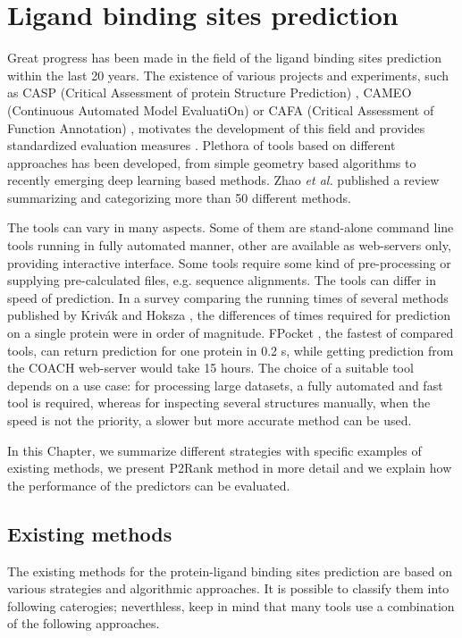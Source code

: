 \chapter{Ligand binding sites prediction} \label{ch:2}

Great progress has been made in the field of the ligand binding sites prediction within the last 20 years. The existence of various projects and experiments, such as CASP (Critical Assessment of protein Structure Prediction) \cite{casp_def}, CAMEO (Continuous Automated Model EvaluatiOn) \cite{cameo} or CAFA (Critical Assessment of Function Annotation) \cite{cafa}, motivates the development of this field and provides standardized evaluation measures \cite{methods}. Plethora of tools based on different approaches has been developed, from simple geometry based algorithms to recently emerging deep learning based methods. Zhao \textit{et al.} \cite{methods} published a review summarizing and categorizing more than 50 different methods.

The tools can vary in many aspects. Some of them are stand-alone command line tools running in fully automated manner, other are available as web-servers only, providing interactive interface. Some tools require some kind of pre-processing or supplying pre-calculated files, e.g. sequence alignments. The tools can differ in speed of prediction. In a survey comparing the running times of several methods published by Krivák and Hoksza \cite{p2rank1}, the differences of times required for prediction on a single protein were in order of magnitude. FPocket \cite{fpocket}, the fastest of compared tools, can return prediction for one protein in 0.2 s, while getting prediction from the COACH web-server \cite{coach} would take 15 hours. The choice of a suitable tool depends on a use case: for processing large datasets, a fully automated and fast tool is required, whereas for inspecting several structures manually, when the speed is not the priority, a slower but more accurate method can be used.

In this Chapter, we summarize different strategies with specific examples of existing methods, we present P2Rank method in more detail and we explain how the performance of the predictors can be evaluated.

\section{Existing methods} \label{s:existingmethods}

The existing methods for the protein-ligand binding sites prediction are based on various strategies and algorithmic approaches. It is possible to classify them into following caterogies; neverthless, keep in mind that many tools use a combination of the following approaches.


